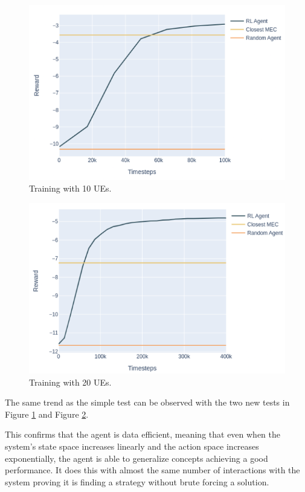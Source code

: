\documentclass[conference]{IEEEtran}
\begin{document}
\begin{figure}[H]
  \centering
  \includegraphics[width=\linewidth]{images/5_10_training.png}
  \caption{Training with 10 \acrshort{UE}s.}  \label{5_10_training}
\end{figure}
\begin{figure}[H]
  \centering
  \includegraphics[width=\linewidth]{images/5_20_training.png}
  \caption{Training with 20 \acrshort{UE}s.}  \label{5_20_training}
\end{figure}

The same trend as the simple test can be observed with the two new tests in Figure \ref{5_10_training} and Figure \ref{5_20_training}.

This confirms that the agent is data efficient, meaning that even when the system's state space increases linearly and the action space increases exponentially, the agent is able to generalize concepts achieving a good performance. It does this with almost the same number of interactions with the system proving it is finding a strategy without brute forcing a solution.
\end{document}
